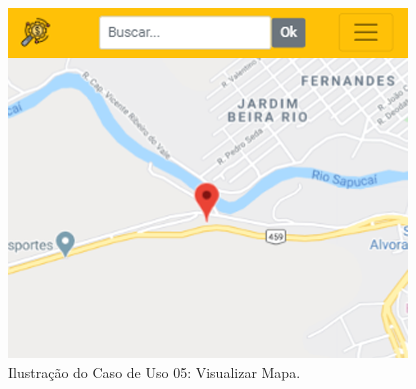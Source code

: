 \begin{figure}[H]
\centering
\includegraphics[width=\linewidth]{figuras/tela_mapa.png}
\caption{Ilustração do Caso de Uso 05: Visualizar Mapa.}
\label{fig:mapa}
\end{figure}

